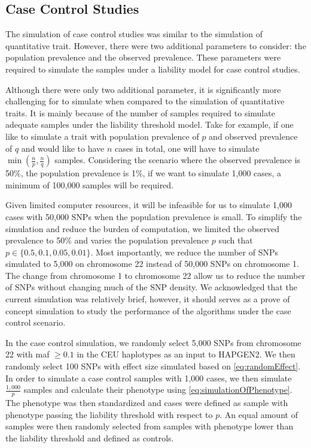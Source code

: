 		\subsection{Case Control Studies}
		The simulation of case control studies was similar to the simulation of quantitative trait. 
		However, there were two additional parameters to consider: the population prevalence and the observed prevalence.
		These parameters were required to simulate the samples under a liability model for case control studies.

		Although there were only two additional parameter, it is significantly more challenging for to simulate when compared to the simulation of quantitative traits.
		It is mainly because of the number of samples required to simulate adequate samples under the liability threshold model.
		Take for example, if one like to simulate a trait with population prevalence of $p$ and observed prevalence of $q$ and would like to have $n$ cases in total, one will have to simulate $\min(\frac{n}{p}, \frac{n}{q})$ samples.
		Considering the scenario where the observed prevalence is 50\%, the population prevalence is 1\%, if we want to simulate 1,000 cases, a minimum of 100,000 samples will be required.
		
		Given limited computer resources, it will be infeasible for us to simulate 1,000 cases with 50,000 \glspl{SNP} when the population prevalence is small.
		To simplify the simulation and reduce the burden of computation, we limited the observed prevalence to 50\% and varies the population prevalence $p$ such that $p\in\{0.5, 0.1, 0.05, 0.01\}$.
		Most importantly, we reduce the number of \glspl{SNP} simulated to 5,000 on chromosome 22 instead of 50,000 \glspl{SNP} on chromosome 1. 
		The change from chromosome 1 to chromosome 22 allow us to reduce the number of \glspl{SNP} without changing much of the \gls{SNP} density. 
		We acknowledged that the current simulation was relatively brief, however, it should serves as a prove of concept simulation to study the performance of the algorithms under the case control scenario.
		
		In the case control simulation, we randomly select 5,000 \glspl{SNP} from chromosome 22 with \gls{maf} $\ge0.1$ in the \gls{CEU} haplotypes as an input to HAPGEN2. 
		We then randomly select 100 \glspl{SNP} with effect size simulated based on \cref{eq:randomEffect}.
		In order to simulate a case control samples with 1,000 cases, we then simulate $\frac{1,000}{p}$ samples and calculate their phenotype using \cref{eq:simulationOfPhenotype}.
		The phenotype was then standardized and cases were defined as sample with phenotype passing the liability threshold with respect to $p$.
		An equal amount of samples were then randomly selected from samples with phenotype lower than the liability threshold and defined as controls.
			
